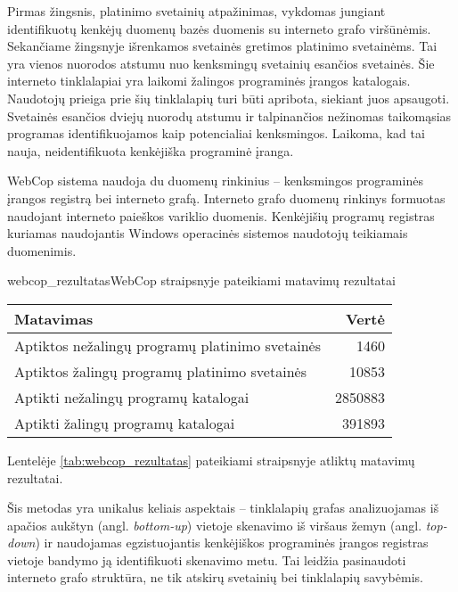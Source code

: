 Pirmas žingsnis, platinimo svetainių atpažinimas, vykdomas jungiant identifikuotų kenkėjų duomenų bazės duomenis su interneto grafo viršūnėmis. Sekančiame žingsnyje išrenkamos svetainės gretimos platinimo svetainėms. Tai yra vienos nuorodos atstumu nuo kenksmingų svetainių esančios svetainės. Šie interneto tinklalapiai yra laikomi žalingos programinės įrangos katalogais. Naudotojų prieiga prie šių tinklalapių turi būti apribota, siekiant juos apsaugoti. Svetainės esančios dviejų nuorodų atstumu ir talpinančios nežinomas taikomąsias programas identifikuojamos kaip potencialiai kenksmingos. Laikoma, kad tai nauja, neidentifikuota kenkėjiška programinė įranga.

WebCop sistema naudoja du duomenų rinkinius -- kenksmingos programinės įrangos registrą bei interneto grafą. Interneto grafo duomenų rinkinys formuotas naudojant interneto paieškos variklio duomenis. Kenkėjišių programų registras kuriamas naudojantis Windows operacinės sistemos naudotojų teikiamais duomenimis.

\begin{ktutable}{webcop_rezultatas}{WebCop straipsnyje pateikiami matavimų rezultatai}
    \begin{tabular}{| l | r |}
     \hline
        Matavimas & Vertė \\ \hline
        Aptiktos nežalingų programų platinimo svetainės & 1460 \\ \hline
        Aptiktos žalingų programų platinimo svetainės & 10853 \\ \hline
        Aptikti nežalingų programų katalogai & 2850883 \\ \hline
        Aptikti žalingų programų katalogai & 391893 \\ \hline
    \end{tabular}
\end{ktutable}

Lentelėje \vref{tab:webcop_rezultatas} pateikiami straipsnyje atliktų matavimų rezultatai.

Šis metodas yra unikalus keliais aspektais -- tinklalapių grafas analizuojamas iš apačios aukštyn (angl. \textit{bottom-up}) vietoje skenavimo iš viršaus žemyn (angl. \textit{top-down}) ir naudojamas egzistuojantis kenkėjiškos programinės įrangos registras vietoje bandymo ją identifikuoti skenavimo metu. Tai leidžia pasinaudoti interneto grafo struktūra, ne tik atskirų svetainių bei tinklalapių savybėmis.